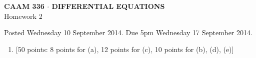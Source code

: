 \documentclass[10pt]{article}
\begin{document}
\vspace*{-5em}
\begin{center}
\large \textsf{\textbf{CAAM 336 $\cdot$ DIFFERENTIAL EQUATIONS}\\[0.5em]
Homework 2 }
\end{center}

Posted Wednesday 10 September 2014. Due 5pm Wednesday 17 September 2014.

\begin{enumerate}\addtocounter{enumi}{0}




\item {[50 points: 8 points for (a), 12 points for (c), 10 points for (b), (d), (e)]}  
\end{enumerate}
\end{document}

